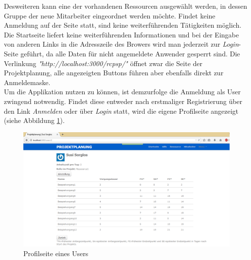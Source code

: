 \documentclass[a4paper,12pt,parskip,bibtotoc,liststotoc]{article}
\begin{document}
Desweiteren kann eine der vorhandenen Ressourcen ausgewählt werden, in dessen Gruppe der neue Mitarbeiter eingeordnet werden möchte. Findet keine Anmeldung auf der Seite statt, sind keine weiterführenden Tätigkeiten möglich. Die Startseite liefert keine weiterführenden Informationen und bei der Eingabe von anderen Links in die Adresszeile des Browers wird man jederzeit zur \textit{Login}-Seite geführt, da alle Daten für nicht angemeldete Anwender gesperrt sind. Die Verlinkung \textit{"http://localhost:3000/rcpsp/"} öffnet zwar die Seite der Projektplanung, alle angezeigten Buttons führen aber ebenfalls direkt zur Anmeldemaske. \\

Um die Applikation nutzen zu können, ist demzurfolge die Anmeldung als User zwingend notwendig. Findet diese entweder nach erstmaliger Registrierung über den Link \textit{Anmelden} oder über \textit{Login} statt, wird die eigene Profilseite angezeigt (siehe Abbildung \ref{Profil}).\\

\begin{figure}[h!]
  \begin{center}
    \includegraphics[width=120mm]{Bilder/Profilseite.png}
    \caption{Profilseite eines Users}  \label{Profil}
  \end{center}
\end{figure}
\end{document}

